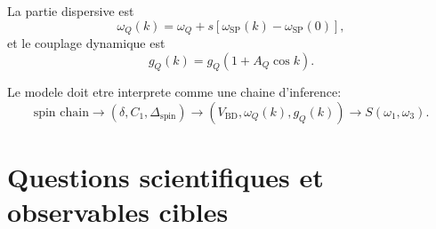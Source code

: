 \documentclass[11pt]{article}
\begin{document}
La partie dispersive est
\begin{equation}
\omega_Q(k)
=
\omega_Q
+
s\left[\omega_{\mathrm{SP}}(k)-\omega_{\mathrm{SP}}(0)\right],
\end{equation}
et le couplage dynamique est
\begin{equation}
g_Q(k)
=
g_Q\left(1+A_Q\cos k\right).
\end{equation}

Le modele doit etre interprete comme une chaine d'inference:
\begin{equation}
\text{spin chain}
\rightarrow
(\delta,C_1,\Delta_{\mathrm{spin}})
\rightarrow
(V_{\mathrm{BD}},\omega_Q(k),g_Q(k))
\rightarrow
S(\omega_1,\omega_3).
\end{equation}

\section{Questions scientifiques et observables cibles}
\end{document}
